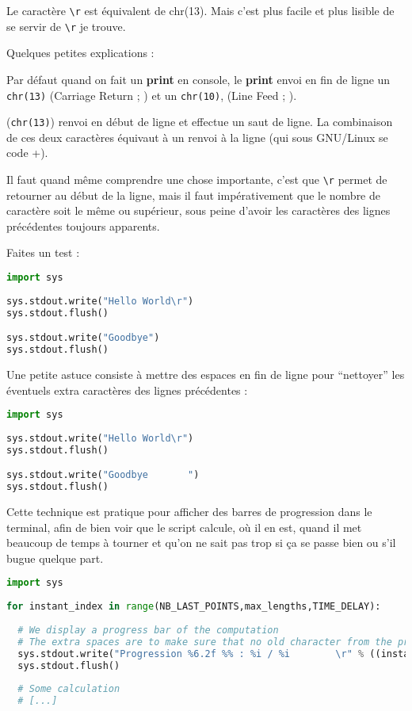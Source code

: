 \documentclass[a4paper,twoside]{article}
\begin{document}
Le caractère \verb|\r| est équivalent de chr(13). Mais c'est plus facile et plus lisible de se servir de \verb|\r| je trouve.

\begin{remarque}
Quelques petites explications :

Par défaut quand on fait un \textbf{print} en console, le \textbf{print} envoi en fin de ligne un \texttt{chr(13)} (Carriage Return ; ) et un \texttt{chr(10)}, (Line Feed ; ).

 (\texttt{chr(13)}) renvoi en début de ligne et  effectue un saut de ligne. La combinaison de ces deux caractères équivaut à un renvoi à la ligne (qui sous GNU/Linux se code +).
\end{remarque}

\bigskip

Il faut quand même comprendre une chose importante, c'est que \verb|\r| permet de retourner au début de la ligne, mais il faut impérativement que le nombre de caractère soit le même ou supérieur, sous peine d'avoir les caractères des lignes précédentes toujours apparents. 

Faites un test : 
\begin{lstlisting}[language=python]
import sys
 
sys.stdout.write("Hello World\r")
sys.stdout.flush()

sys.stdout.write("Goodbye")
sys.stdout.flush()
\end{lstlisting}

Une petite astuce consiste à mettre des espaces en fin de ligne pour ``nettoyer'' les éventuels extra caractères des lignes précédentes :
\begin{lstlisting}[language=python]
import sys
 
sys.stdout.write("Hello World\r")
sys.stdout.flush()

sys.stdout.write("Goodbye       ")
sys.stdout.flush()
\end{lstlisting}


\bigskip

Cette technique est pratique pour afficher des barres de progression dans le terminal, afin de bien voir que le script calcule, où il en est, quand il met beaucoup de temps à tourner et qu'on ne sait pas trop si ça se passe bien ou s'il bugue quelque part.
\begin{lstlisting}[language=python]
import sys
 
for instant_index in range(NB_LAST_POINTS,max_lengths,TIME_DELAY):
  
  # We display a progress bar of the computation
  # The extra spaces are to make sure that no old character from the previous line will appear
  sys.stdout.write("Progression %6.2f %% : %i / %i        \r" % ((instant_index * 100. / float(max_lengths)), instant_index, max_lengths))
  sys.stdout.flush()
  
  # Some calculation
  # [...]
\end{lstlisting}
\end{document}
